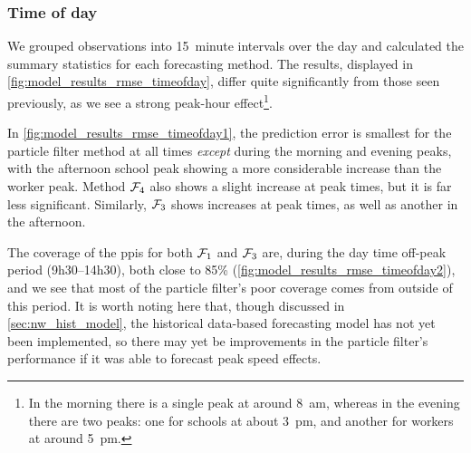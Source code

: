 \subsubsection{Time of day}

We grouped observations into 15~minute intervals over the day and calculated the summary statistics for each forecasting method. The results, displayed in \cref{fig:model_results_rmse_timeofday}, differ quite significantly from those seen previously, as we see a strong peak-hour effect\footnote{In the morning there is a single peak at around 8~am, whereas in the evening there are two peaks: one for schools at about 3~pm, and another for workers at around 5~pm.}.

In \cref{fig:model_results_rmse_timeofday1}, the prediction error is smallest for the particle filter method at all times \emph{except} during the morning and evening peaks, with the afternoon school peak showing a more considerable increase than the worker peak. Method $\mathcal{F}_4$ also shows a slight increase at peak times, but it is far less significant. Similarly, $\mathcal{F}_3$ shows increases at peak times, as well as another in the afternoon.


The coverage of the \glspl{ppi} for both $\mathcal{F}_1$ and $\mathcal{F}_3$ are, during the day time off-peak period (9h30--14h30), both close to 85\% (\cref{fig:model_results_rmse_timeofday2}), and we see that most of the particle filter's poor coverage comes from outside of this period. It is worth noting here that, though discussed in \cref{sec:nw_hist_model}, the historical data-based forecasting model has not yet been implemented, so there may yet be improvements in the particle filter's performance if it was able to forecast peak speed effects.





